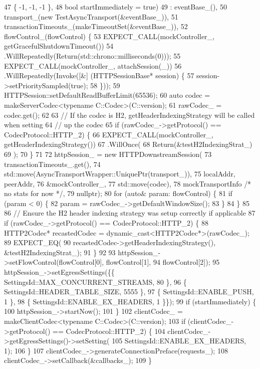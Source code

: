 \begin{DoxyCode}
47                                      \{ -1, -1, -1 \},
48     \textcolor{keywordtype}{bool} startImmediately = \textcolor{keyword}{true})
49     : eventBase_(),
50       transport_(\textcolor{keyword}{new} TestAsyncTransport(&eventBase_)),
51       transactionTimeouts_(makeTimeoutSet(&eventBase_)),
52       flowControl_(flowControl) \{
53     EXPECT\_CALL(mockController_, getGracefulShutdownTimeout())
54       .WillRepeatedly(Return(std::chrono::milliseconds(0)));
55     EXPECT\_CALL(mockController_, attachSession(\_))
56       .WillRepeatedly(Invoke([&] (HTTPSessionBase* session) \{
57         session->setPrioritySampled(\textcolor{keyword}{true});
58       \}));
59     HTTPSession::setDefaultReadBufferLimit(65536);
60     \textcolor{keyword}{auto} codec = makeServerCodec<typename C::Codec>(C::version);
61     rawCodec_ = codec.get();
62 
63     \textcolor{comment}{// If the codec is H2, getHeaderIndexingStrategy will be called when setting}
64     \textcolor{comment}{// up the codec}
65     \textcolor{keywordflow}{if} (rawCodec\_->getProtocol() == CodecProtocol::HTTP\_2) \{
66       EXPECT\_CALL(mockController_, getHeaderIndexingStrategy())
67         .WillOnce(
68           Return(&testH2IndexingStrat_)
69       );
70     \}
71 
72     httpSession_ = \textcolor{keyword}{new} HTTPDownstreamSession(
73       transactionTimeouts_.get(),
74       std::move(AsyncTransportWrapper::UniquePtr(transport_)),
75       localAddr, peerAddr,
76       &mockController_,
77       std::move(codec),
78       mockTransportInfo \textcolor{comment}{/* no stats for now */},
79       \textcolor{keyword}{nullptr});
80     \textcolor{keywordflow}{for} (\textcolor{keyword}{auto}& param: flowControl) \{
81       \textcolor{keywordflow}{if} (param < 0) \{
82         param = rawCodec\_->getDefaultWindowSize();
83       \}
84     \}
85 
86     \textcolor{comment}{// Ensure the H2 header indexing strategy was setup correctly if applicable}
87     \textcolor{keywordflow}{if} (rawCodec\_->getProtocol() == CodecProtocol::HTTP\_2) \{
88       HTTP2Codec* recastedCodec = \textcolor{keyword}{dynamic\_cast<}HTTP2Codec*\textcolor{keyword}{>}(rawCodec_);
89       EXPECT\_EQ(
90         recastedCodec->getHeaderIndexingStrategy(), &testH2IndexingStrat_);
91     \}
92 
93     httpSession_->setFlowControl(flowControl[0], flowControl[1],
94                                  flowControl[2]);
95     httpSession_->setEgressSettings(\{\{ SettingsId::MAX\_CONCURRENT\_STREAMS, 80 \},
96                                      \{ SettingsId::HEADER\_TABLE\_SIZE, 5555 \},
97                                      \{ SettingsId::ENABLE\_PUSH, 1 \},
98                                      \{ SettingsId::ENABLE\_EX\_HEADERS, 1 \}\});
99     \textcolor{keywordflow}{if} (startImmediately) \{
100       httpSession_->startNow();
101     \}
102     clientCodec_ = makeClientCodec<typename C::Codec>(C::version);
103     \textcolor{keywordflow}{if} (clientCodec_->getProtocol() == CodecProtocol::HTTP\_2) \{
104       clientCodec_->getEgressSettings()->setSetting(
105         SettingsId::ENABLE\_EX\_HEADERS, 1);
106     \}
107     clientCodec_->generateConnectionPreface(requests_);
108     clientCodec_->setCallback(&callbacks_);
109   \}
\end{DoxyCode}


